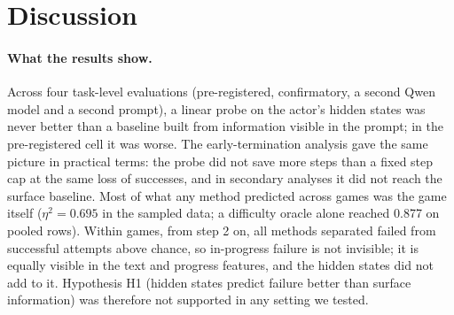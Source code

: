 \documentclass[11pt]{article}
\begin{document}
\section{Discussion}
\paragraph{What the results show.} Across four task-level evaluations (pre-registered, confirmatory, a second Qwen model and a second prompt), a linear probe on the actor's hidden states was never better than a baseline built from information visible in the prompt; in the pre-registered cell it was worse.
The early-termination analysis gave the same picture in practical terms: the probe did not save more steps than a fixed step cap at the same loss of successes, and in secondary analyses it did not reach the surface baseline.
Most of what any method predicted across games was the game itself ($\eta^2 = 0.695$ in the sampled data; a difficulty oracle alone reached 0.877 on pooled rows). Within games, from step 2 on, all methods separated failed from successful attempts above chance,
so in-progress failure is not invisible; it is equally visible in the text and progress features, and the hidden states did not add to it.
Hypothesis H1 (hidden states predict failure better than surface information) was therefore not supported in any setting we tested.
\end{document}
